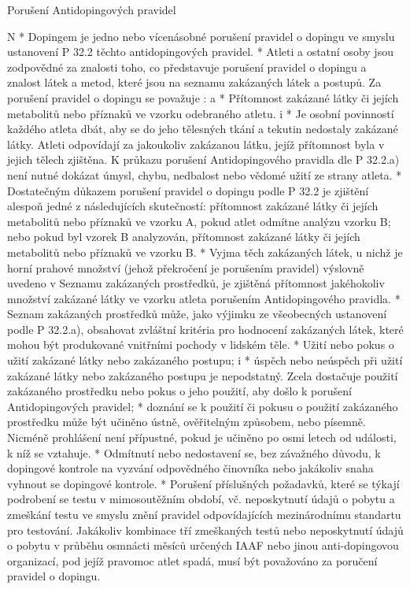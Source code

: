\secc Porušení Antidopingových pravidel

\begitems \style N
* Dopingem je jedno nebo vícenásobné porušení pravidel o dopingu ve smyslu ustanovení P 32.2 těchto antidopingových pravidel.
* Atleti a ostatní osoby jsou zodpovědné za znalosti toho, co představuje porušení pravidel o dopingu a znalost látek a metod, které jsou na seznamu zakázaných látek a postupů. Za porušení pravidel o dopingu se považuje :
  \begitems \style a
  * Přítomnost zakázané látky či jejích metabolitů nebo příznaků ve vzorku odebraného atletu.
    \begitems \style i
    * Je osobní povinností každého atleta dbát, aby se do jeho tělesných tkání a tekutin nedostaly zakázané látky. Atleti odpovídají za jakoukoliv zakázanou látku, jejíž přítomnost byla v jejich tělech zjištěna. K průkazu porušení Antidopingového pravidla dle P 32.2.a) není nutné dokázat úmysl, chybu, nedbalost nebo vědomé užití ze strany atleta.
    * Dostatečným důkazem porušení pravidel o dopingu podle P 32.2 je zjištění alespoň jedné z následujících skutečností: přítomnost zakázané látky či jejích metabolitů nebo příznaků ve vzorku A, pokud atlet odmítne analýzu vzorku B; nebo pokud byl vzorek B analyzován, přítomnost zakázané látky či jejích metabolitů nebo příznaků ve vzorku B.
    * Vyjma těch zakázaných látek, u nichž je horní prahové množství (jehož překročení je porušením pravidel) výslovně uvedeno v Seznamu zakázaných prostředků, je zjištěná přítomnost jakéhokoliv množství zakázané látky ve vzorku atleta porušením Antidopingového pravidla.
    * Seznam zakázaných prostředků může, jako výjimku ze všeobecných ustanovení podle P 32.2.a), obsahovat zvláštní kritéria pro hodnocení zakázaných látek, které mohou být produkované vnitřními pochody v lidském těle.
    \enditems
  * Užití nebo pokus o užití zakázané látky nebo zakázaného postupu;
    \begitems \style i
    * úspěch nebo neúspěch při užití zakázané látky nebo zakázaného postupu je nepodstatný. Zcela dostačuje použití zakázaného prostředku nebo pokus o jeho použití, aby došlo k porušení Antidopingových pravidel;
    * doznání se k použití či pokusu o použití zakázaného prostředku může být učiněno ústně, ověřitelným způsobem, nebo písemně. Nicméně prohlášení není přípustné, pokud je učiněno po osmi letech od události, k níž se vztahuje.
    \enditems
  * Odmítnutí nebo nedostavení se, bez závažného důvodu, k dopingové kontrole na vyzvání odpovědného činovníka nebo jakákoliv snaha vyhnout se dopingové kontrole.
  * Porušení příslušných požadavků, které se týkají podrobení se testu v mimosoutěžním období, vč. neposkytnutí údajů o pobytu a zmeškání testu ve smyslu znění pravidel odpovídajících mezinárodnímu standartu pro testování. Jakákoliv kombinace tří zmeškaných testů nebo neposkytnutí údajů o pobytu v průběhu osmnácti měsíců určených IAAF nebo jinou anti-dopingovou organizací, pod jejíž pravomoc atlet spadá, musí být považováno za poručení pravidel o dopingu.
